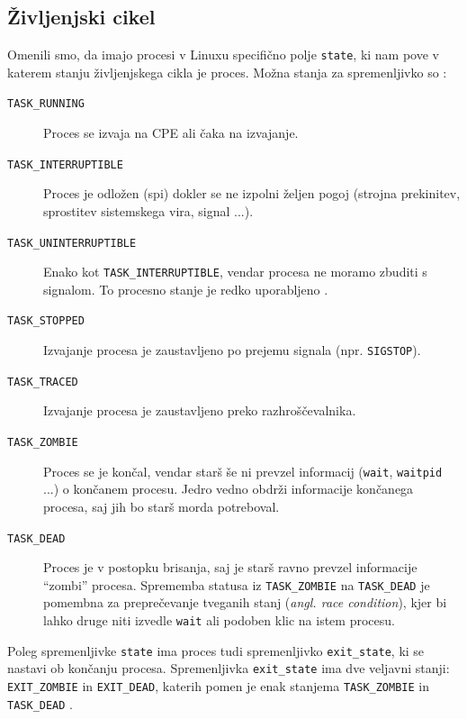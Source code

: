 \documentclass[a4paper,12pt,openright]{book}
\begin{document}
\subsection{Življenjski cikel} \label{ssec:linux_process:lifecycle}

Omenili smo, da imajo procesi v Linuxu specifično polje \texttt{state}, ki nam pove v katerem stanju življenjskega cikla je proces.
Možna stanja za spremenljivko so \cite{Bovet_Cesati_2005}:
\begin{description}
	\item[\texttt{TASK\_RUNNING}] Proces se izvaja na CPE ali čaka na izvajanje.
	\item[\texttt{TASK\_INTERRUPTIBLE}] Proces je odložen (spi) dokler se ne izpolni željen pogoj (strojna prekinitev, sprostitev sistemskega vira, signal ...).
	\item[\texttt{TASK\_UNINTERRUPTIBLE}] Enako kot \texttt{TASK\_INTERRUPTIBLE}, vendar procesa ne moramo zbuditi s signalom.
	To procesno stanje je redko uporabljeno \cite{Bovet_Cesati_2005}.
	\item[\texttt{TASK\_STOPPED}] Izvajanje procesa je zaustavljeno po prejemu signala (npr. \texttt{SIGSTOP}).
	\item[\texttt{TASK\_TRACED}] Izvajanje procesa je zaustavljeno preko razhroščevalnika.
	\item[\texttt{TASK\_ZOMBIE}] Proces se je končal, vendar starš še ni prevzel informacij (\texttt{wait}, \texttt{waitpid} ...) o končanem procesu.
	Jedro vedno obdrži informacije končanega procesa, saj jih bo starš morda potreboval.
	\item[\texttt{TASK\_DEAD}] Proces je v postopku brisanja, saj je starš ravno prevzel informacije ``zombi'' procesa.
	Sprememba statusa iz \texttt{TASK\_ZOMBIE} na \texttt{TASK\_DEAD} je pomembna za preprečevanje tveganih stanj (\textit{angl. race condition}), kjer bi lahko druge niti izvedle \texttt{wait} ali podoben klic na istem procesu.
\end{description}

Poleg spremenljivke \texttt{state} ima proces tudi spremenljivko \texttt{exit\_state}, ki se nastavi ob končanju procesa.
Spremenljivka \texttt{exit\_state} ima dve veljavni stanji: \texttt{EXIT\_ZOMBIE} in \texttt{EXIT\_DEAD}, katerih pomen je enak stanjema \texttt{TASK\_ZOMBIE} in \texttt{TASK\_DEAD} \cite{Bovet_Cesati_2005}.
\end{document}
